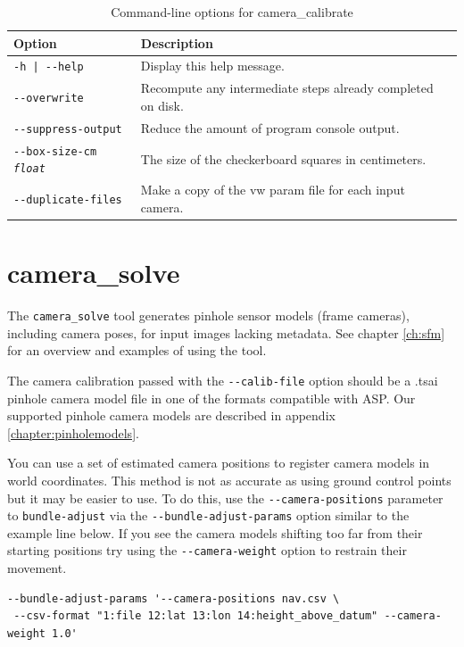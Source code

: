 \begin{longtable}{|l|p{7.5cm}|}
\caption{Command-line options for camera\_calibrate}
\label{tbl:cameracalibrate}
\endfirsthead
\endhead
\endfoot
\endlastfoot
\hline
Option & Description \\ \hline \hline
\texttt{-h | -\/-help } & Display this help message.\\ \hline
\texttt{-\/-overwrite}  & Recompute any intermediate steps already completed on disk.\\ \hline
\texttt{-\/-suppress-output} & Reduce the amount of program console output.\\ \hline
\texttt{-\/-box-size-cm  \textit{float}} & The size of the checkerboard squares in centimeters.\\ \hline
\texttt{-\/-duplicate-files} & Make a copy of the vw param file for each input camera.\\ \hline
\end{longtable}

\section{camera\_solve}
\label{camerasolve}

The \texttt{camera\_solve} tool generates pinhole sensor models (frame
cameras), including camera poses, for input images lacking metadata.  See chapter
\ref{ch:sfm} for an overview and examples of using the tool.

The camera calibration passed with the \texttt{-\/-calib-file} option
 should be a .tsai pinhole camera model file in one of the formats
compatible with ASP.  Our supported pinhole camera models are described
in appendix \ref{chapter:pinholemodels}.


You can use a set of estimated camera positions to register
camera models in world coordinates.
This method is not as accurate as using ground control points but it may
be easier to use.  To do this, use the \texttt{-\/-camera-positions} parameter to
\texttt{bundle-adjust} via the \texttt{-\/-bundle-adjust-params} option similar to
the example line below.  If you see the camera models shifting too far from their
starting positions try using the \texttt{-\/-camera-weight} option to restrain
their movement.

\begin{verbatim}
--bundle-adjust-params '--camera-positions nav.csv \
 --csv-format "1:file 12:lat 13:lon 14:height_above_datum" --camera-weight 1.0'
\end{verbatim}

